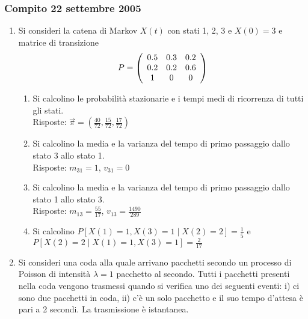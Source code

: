 \documentclass{article}
\begin{document}
\subsubsection{Compito 22 settembre 2005}
\begin{enumerate}

    \item Si consideri la catena di Markov $X(t)$ con stati 1, 2, 3 e $X(0) = 3$ e matrice di transizione
    \begin{align*}
    P = \left(\begin{array}{c c c}
    0.5 & 0.3 & 0.2\\
    0.2 & 0.2 & 0.6\\
    1 & 0 & 0
    \end{array}\right)
    \end{align*}
    		
    		\begin{enumerate}[label=\alph*)]
        \item Si calcolino le probabilità stazionarie e i tempi medi di ricorrenza di tutti gli stati.\\
        
        Risposte: $\vec{\pi} = (\frac{40}{72},\frac{15}{72},\frac{17}{72})$
        \item Si calcolino la media e la varianza del tempo di primo passaggio dallo stato 3 allo stato 1.\\
        
        Risposte: $m_{31}=1$, $v_{31}=0$
        \item Si calcolino la media e la varianza del tempo di primo passaggio dallo stato 1 allo stato 3.\\
        
        Risposte: $m_{13}=\frac{55}{17}$, $v_{13}=\frac{1490}{289}$
        \item Si calcolino $P[X(1) = 1, X(3) = 1\mid X(2) = 2] = \frac{1}{5}$ e $P[X(2) = 2\mid X(1) = 1, X(3) = 1] = \frac{2}{17}$
    \end{enumerate}

    \item Si consideri una coda alla quale arrivano pacchetti secondo un processo di Poisson di intensità $\lambda = 1$ pacchetto al secondo.
    Tutti i pacchetti presenti nella coda vengono trasmessi quando si verifica uno dei seguenti eventi: i) ci sono due pacchetti in coda, ii) c'è un solo pacchetto e il suo tempo d'attesa è pari a 2 secondi.
    La trasmissione è istantanea.\\
    

\end{enumerate}
\end{document}
